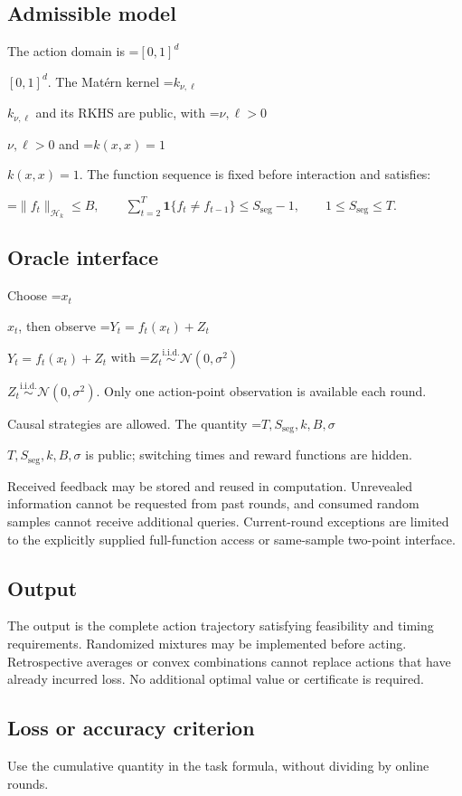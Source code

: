 \documentclass[10pt,a4paper]{article}
\newcommand{\AtlasMath}[1]{\par\begingroup\centering\setbox0=\hbox{$\displaystyle #1$}\ifdim\wd0>1.4\linewidth\typeout{ATLAS WIDE FORMULA: \the\wd0}\fi\ifdim\wd0>\linewidth\resizebox{\linewidth}{!}{\box0}\else\box0\fi\par\endgroup}
\newcommand{\AtlasInlineMath}[1]{\begingroup\setbox0=\hbox{$#1$}\ifdim\wd0>.4\linewidth\endgroup\AtlasMath{#1}\else\endgroup$#1$\fi}
\begin{document}
\subsection{Admissible model}
The action domain is \AtlasInlineMath{[0,1]^d}. The Matérn kernel \AtlasInlineMath{k_{\nu,\ell}} and its RKHS are public, with \AtlasInlineMath{\nu,\ell>0} and \AtlasInlineMath{k(x,x)=1}. The function sequence is fixed before interaction and satisfies:


\AtlasMath{\|f_t\|_{\mathcal{H}_k}\le B,\qquad \sum_{t=2}^{T}\mathbf 1\{f_t\ne f_{t-1}\}\le S_{\mathrm{seg}}-1,\qquad 1\le S_{\mathrm{seg}}\le T.}


\subsection{Oracle interface}
Choose \AtlasInlineMath{x_t}, then observe \AtlasInlineMath{Y_t=f_t(x_t)+Z_t} with \AtlasInlineMath{Z_t\overset{\mathrm{i.i.d.}}\sim\mathcal{N}(0,\sigma^2)}. Only one action-point observation is available each round.

Causal strategies are allowed. The quantity \AtlasInlineMath{T,S_{\mathrm{seg}},k,B,\sigma} is public; switching times and reward functions are hidden.

Received feedback may be stored and reused in computation. Unrevealed information cannot be requested from past rounds, and consumed random samples cannot receive additional queries. Current-round exceptions are limited to the explicitly supplied full-function access or same-sample two-point interface.

\subsection{Output}
The output is the complete action trajectory satisfying feasibility and timing requirements. Randomized mixtures may be implemented before acting. Retrospective averages or convex combinations cannot replace actions that have already incurred loss. No additional optimal value or certificate is required.

\subsection{Loss or accuracy criterion}
Use the cumulative quantity in the task formula, without dividing by online rounds.
\end{document}
